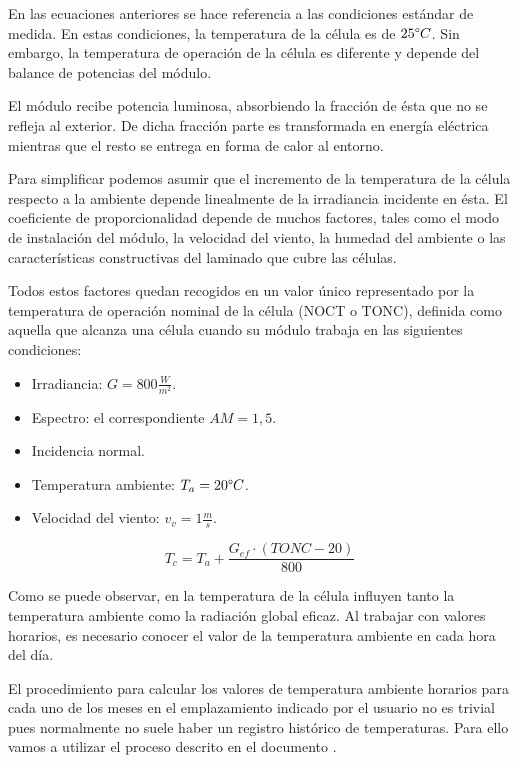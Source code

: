 En las ecuaciones anteriores se hace referencia a las condiciones estándar de medida. En estas condiciones, la temperatura de la célula es de $25\degree C$. Sin embargo, la temperatura de operación de la célula es diferente y depende del balance de potencias del módulo.

El módulo recibe potencia luminosa, absorbiendo la fracción de ésta que no se refleja al exterior. De dicha fracción parte es transformada en energía eléctrica mientras que el resto se entrega en forma de calor al entorno.

Para simplificar podemos asumir que el incremento de la temperatura de la célula respecto a la ambiente depende linealmente de la irradiancia incidente en ésta. El coeficiente de proporcionalidad depende de muchos factores, tales como el modo de instalación del módulo, la velocidad del viento, la humedad del ambiente o las características constructivas del laminado que cubre las células.

Todos estos factores quedan recogidos en un valor único representado por la temperatura de operación nominal de la célula (NOCT o TONC), definida como aquella que alcanza una célula cuando su módulo trabaja en las siguientes condiciones:
\begin{itemize}
\item Irradiancia: $G=800 \frac{W}{m^2}$.
\item Espectro: el correspondiente $AM=1,5$.
\item Incidencia normal.
\item Temperatura ambiente: $T_a = 20 \degree C$.
\item Velocidad del viento:  $ v_v = 1 \frac{m}{s}$.
\end{itemize}

\begin{equation}
\label{eqn:T_c}
T_c = T_a + \frac{G_{ef}\cdot(TONC - 20)}{800}
\end{equation}

Como se puede observar, en la temperatura de la célula influyen tanto la temperatura ambiente como la radiación global eficaz. Al trabajar con valores horarios, es necesario conocer el valor de la temperatura ambiente en cada hora del día.



El procedimiento para calcular los valores de temperatura ambiente horarios para cada uno de los meses en el emplazamiento indicado por el usuario no es trivial pues normalmente no suele haber un registro histórico de temperaturas. Para ello vamos a utilizar el proceso descrito en el documento \cite{temp_paper}.

